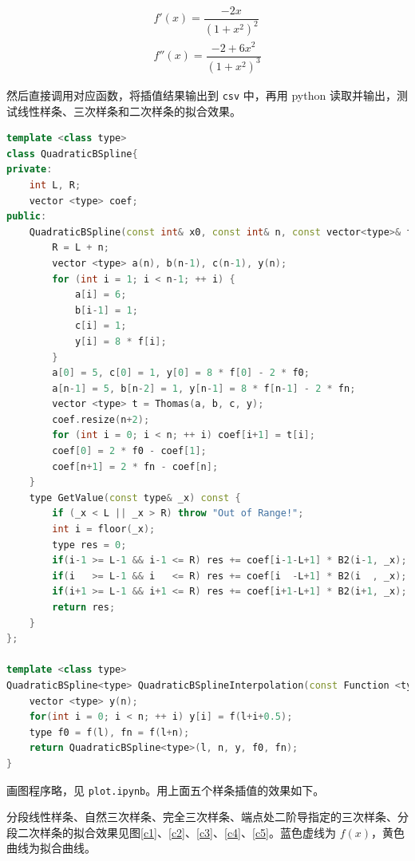 \documentclass{ctexart}
\begin{document}
\begin{gather}
f'(x)=\dfrac {-2x}{(1+x^2)^2} \\
f''(x)=\dfrac {-2+6x^2}{(1+x^2)^3}
\end{gather}

然后直接调用对应函数，将插值结果输出到 \verb|csv| 中，再用 python 读取并输出，测试线性样条、三次样条和二次样条的拟合效果。

\begin{lstlisting}[language={c++}]
template <class type>
class QuadraticBSpline{
private:
	int L, R;
	vector <type> coef;
public:
	QuadraticBSpline(const int& x0, const int& n, const vector<type>& f, const type& f0, const type& fn) : L(x0) {
		R = L + n;
		vector <type> a(n), b(n-1), c(n-1), y(n);
		for (int i = 1; i < n-1; ++ i) {
			a[i] = 6;
			b[i-1] = 1;
			c[i] = 1;
			y[i] = 8 * f[i];
		}
		a[0] = 5, c[0] = 1, y[0] = 8 * f[0] - 2 * f0;
		a[n-1] = 5, b[n-2] = 1, y[n-1] = 8 * f[n-1] - 2 * fn;
		vector <type> t = Thomas(a, b, c, y);
		coef.resize(n+2);
		for (int i = 0; i < n; ++ i) coef[i+1] = t[i];
		coef[0] = 2 * f0 - coef[1];
		coef[n+1] = 2 * fn - coef[n];
	}
	type GetValue(const type& _x) const {
		if (_x < L || _x > R) throw "Out of Range!";
		int i = floor(_x);
		type res = 0;
		if(i-1 >= L-1 && i-1 <= R) res += coef[i-1-L+1] * B2(i-1, _x);
		if(i   >= L-1 && i   <= R) res += coef[i  -L+1] * B2(i  , _x);
		if(i+1 >= L-1 && i+1 <= R) res += coef[i+1-L+1] * B2(i+1, _x);
		return res;
	}
};

template <class type>
QuadraticBSpline<type> QuadraticBSplineInterpolation(const Function <type>& f, const int& l, const int& n) {
	vector <type> y(n);
	for(int i = 0; i < n; ++ i) y[i] = f(l+i+0.5);
	type f0 = f(l), fn = f(l+n);
	return QuadraticBSpline<type>(l, n, y, f0, fn);
}
\end{lstlisting}

画图程序略，见 \verb|plot.ipynb|。用上面五个样条插值的效果如下。

分段线性样条、自然三次样条、完全三次样条、端点处二阶导指定的三次样条、分段二次样条的拟合效果见图\ref{c1}、\ref{c2}、\ref{c3}、\ref{c4}、\ref{c5}。蓝色虚线为 $f(x)$，黄色曲线为拟合曲线。
\end{document}
